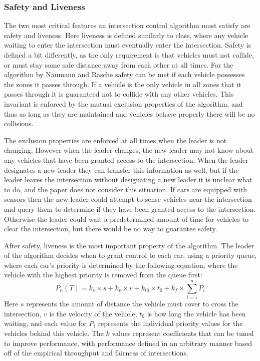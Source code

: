 \documentclass[12pt]{article}
\begin{document}
\subsubsection{Safety and Liveness}
The two most critical features an intersection control algorithm must satisfy are safety and liveness. Here liveness is defined similarly to class, where any vehicle waiting to enter the intersection must eventually enter the intersection. Safety is defined a bit differently, as the only requirement is that vehicles must not collide, or must stay some safe distance away from each other at all times. For the algorithm by Naumann and Rasche safety can be met if each vehicle possesses the zones it passes through. If a vehicle is the only vehicle in all zones that it passes through it is guaranteed not to collide with any other vehicles. This invariant is enforced by the mutual exclusion properties of the algorithm, and thus as long as they are maintained and vehicles behave properly there will be no collisions.\par
The exclusion properties are enforced at all times when the leader is not changing. However when the leader changes, the new leader may not know about any vehicles that have been granted access to the intersection. When the leader designates a new leader they can transfer this information as well, but if the leader leaves the intersection without designating a new leader it is unclear what to do, and the paper does not consider this situation. If cars are equipped with sensors then the new leader could attempt to sense vehicles near the intersection and query them to determine if they have been granted access to the intersection. Otherwise the leader could wait a predetermined amount of time for vehicles to clear the intersection, but there would be no way to guarantee safety.\par
After safety, liveness is the most important property of the algorithm. The leader of the algorithm decides when to grant control to each car, using a priority queue, where each car's priority is determined by the following equation, where the vehicle with the highest priority is removed from the queue first:
\begin{equation}
P_n(T) = k_s \times s + k_v \times v + k_{t0} \times t_0 + k_f \times \sum_{i=1}^{n} P_i 
\end{equation}
Here $s$ represents the amount of distance the vehicle must cover to cross the intersection, $v$ is the velocity of the vehicle, $t_0$ is how long the vehicle has been waiting, and each value for $P_i$ represents the individual priority values for the vehicles behind this vehicle. The $k$ values represent coefficients that can be tuned to improve performance, with performance defined in an arbitrary manner based off of the empirical throughput and fairness of intersections.\par
\end{document}
